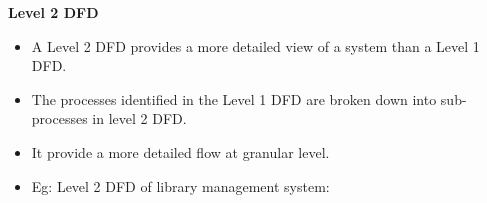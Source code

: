 \begin{flushleft}
	\newpage
	\textbf{Level 2 DFD}
	\begin{itemize}
		\item A Level 2 DFD provides a more detailed view of a system than a Level 1 DFD. 
		\item The processes identified in the Level 1 DFD are broken down into sub-processes in level 2 DFD.
		\item It provide a more detailed flow at granular level.
		\item Eg: Level 2 DFD of library management system:
		\bigskip
	\end{itemize}
	
\end{flushleft}

